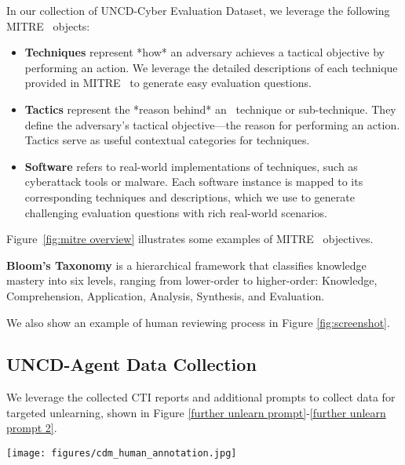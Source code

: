 In our collection of UNCD-Cyber Evaluation Dataset, we leverage the following MITRE \ATTCK\ objects:
\begin{itemize}[nolistsep, leftmargin=*]
    \item \textbf{Techniques} represent *how* an adversary achieves a tactical objective by performing an action. We leverage the detailed descriptions of each technique provided in MITRE \ATTCK\ to generate easy evaluation questions.
    \item \textbf{Tactics} represent the *reason behind* an \ATTCK\ technique or sub-technique. They define the adversary’s tactical objective—the reason for performing an action. Tactics serve as useful contextual categories for techniques.
    \item \textbf{Software} refers to real-world implementations of techniques, such as cyberattack tools or malware. Each software instance is mapped to its corresponding techniques and descriptions, which we use to generate challenging evaluation questions with rich real-world scenarios.
\end{itemize}

Figure~\ref{fig:mitre overview} illustrates some examples of MITRE \ATTCK\ objectives.



\noindent \textbf{Bloom's Taxonomy} is a hierarchical framework that classifies knowledge mastery into six levels, ranging from lower-order to higher-order: Knowledge, Comprehension, Application, Analysis, Synthesis, and Evaluation.

We also show an example of human reviewing process in Figure \ref{fig:screenshot}.


\subsection{UNCD-Agent Data Collection}
\label{UNCD-Agent data}
We leverage the collected CTI reports and additional prompts to collect data for targeted unlearning, shown in Figure \ref{further unlearn prompt}-\ref{further unlearn prompt 2}.



\begin{figure*}
\captionsetup{justification=centering}

    \centering
    \texttt{[image: figures/cdm\_human\_annotation.jpg]}
    \caption{Screenshot of human review.}
    \label{fig:screenshot}
\end{figure*}

